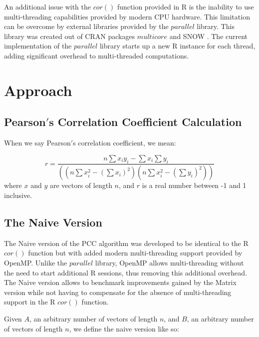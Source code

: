 \documentclass{bioinfo}
\begin{document}
An additional issue with the $cor()$ function provided in R is the inability to 
use multi-threading capabilities provided by modern CPU hardware. This limitation 
can be overcome by external libraries provided by the $parallel$ library. This 
library was created out of CRAN packages $multicore$ \citep{Urbanek2009} and 
SNOW \citep{Tierney2003}. The current implementation of the $parallel$ library 
starts up a new R instance for each thread, adding significant overhead to 
multi-threaded computations.

\vspace*{-6pt}

\section{Approach}
\subsection{Pearson$'$s Correlation Coefficient Calculation}
When we say Pearson$'$s correlation coefficient, we mean:

\begin{equation}
r=\frac{n\sum x_iy_i-\sum x_i\sum y_i}{((n\sum x_i^2-(\sum x_i)^2)(n\sum x_i^2-(\sum y_i)^2))}
\end{equation}
where $x$ and $y$ are vectors of length $n$, and $r$ is a real number between -1 and 1 inclusive.

\subsection{The Naive Version}
The Naive version of the PCC algorithm was developed to be identical 
to the R $cor()$ function but with added modern multi-threading 
support provided by OpenMP. Unlike the $parallel$ library, OpenMP 
allows multi-threading without the need to start additional R 
sessions, thus removing this additional overhead. The Naive version 
allows to benchmark improvements gained by the Matrix version while 
not having to compensate for the absence of multi-threading 
support in the R $cor()$ function.

Given $A$, an arbitrary number of vectors of length $n$, and $B$, an arbitrary number of vectors of length $n$, 
we define the naive version like so:

\vspace{2mm}
\end{document}
